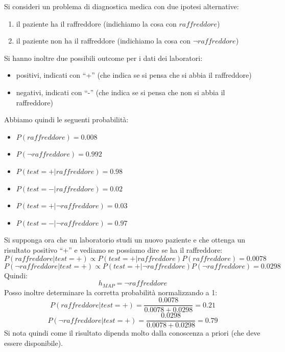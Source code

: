 \begin{esercizio}
  Si consideri un problema di diagnostica medica con due ipotesi alternative:
  \begin{enumerate}
    \item il paziente ha il raffreddore (indichiamo la cosa con $raffreddore$)
    \item il paziente non ha il raffreddore (indichiamo la cosa con $\neg raffreddore$)
  \end{enumerate}
  Si hanno inoltre due possibili outcome per i dati dei laboratori:
  \begin{itemize}
    \item positivi, indicati con ``+'' (che indica se si pensa che si abbia il
    raffreddore)
    \item negativi, indicati con ``-'' (che indica se si pensa che non si abbia
    il raffreddore)
  \end{itemize}
  Abbiamo quindi le seguenti probabilità:
  \begin{itemize}
    \item $P(raffreddore)=0.008$
    \item $P(\neg raffreddore)=0.992$
    \item $P(test=+|raffreddore)=0.98$
    \item $P(test=-|raffreddore)=0.02$
    \item $P(test=+|\neg raffreddore)=0.03$
    \item $P(test=-|\neg raffreddore)=0.97$
  \end{itemize}
  Si supponga ora che un laboratorio studi un nuovo paziente e che ottenga un
  risultato positivo ``+'' e vediamo se possiamo dire se ha il raffreddore:
  \[P(raffreddore|test=+)\varpropto P(test=+|raffreddore)P(raffreddore)=0.0078\]
  \[P(\neg raffreddore|test=+)\varpropto P(test=+|\neg raffreddore)P(\neg raffreddore)=0.0298\]
  Quindi:
  \[h_{MAP}=\neg raffreddore\]
  Posso inoltre determinare la corretta probabilità normalizzando a 1:
  \[P(raffreddore|test=+)=\frac{0.0078}{0.0078+0.0298}=0.21\]
  \[P(\neg raffreddore|test=+)=\frac{0.0298}{0.0078+0.0298}=0.79\]
  Si nota quindi come il risultato dipenda molto dalla conoscenza a priori (che
  deve essere disponibile).
\end{esercizio}

